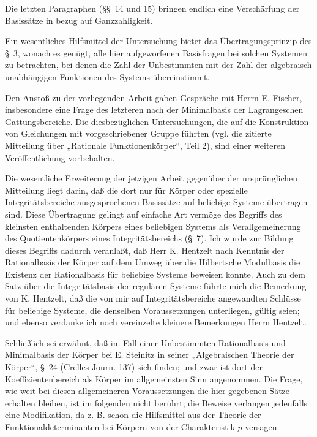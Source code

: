 Die letzten Paragraphen (\S\S\ 14 und 15) bringen endlich eine Verschärfung der Basissätze in bezug auf Ganzzahligkeit.

Ein wesentliches Hilfsmittel der Untersuchung bietet das Übertragungsprinzip des \S\ 3, wonach es genügt, alle hier aufgeworfenen Basisfragen bei solchen Systemen zu betrachten, bei denen die Zahl der Unbestimmten mit der Zahl der algebraisch unabhängigen Funktionen des Systems übereinstimmt.

Den Anstoß zu der vorliegenden Arbeit gaben Gespräche mit Herrn E. Fischer, insbesondere eine Frage des letzteren nach der Minimalbasis der Lagrangeschen Gattungsbereiche. Die diesbezüglichen Untersuchungen, die auf die Konstruktion von Gleichungen mit vorgeschriebener Gruppe führten (vgl. die zitierte Mitteilung über „Rationale Funktionenkörper“, Teil 2), sind einer weiteren Veröffentlichung vorbehalten.

Die wesentliche Erweiterung der jetzigen Arbeit gegenüber der ursprünglichen Mitteilung liegt darin, daß die dort nur für Körper oder spezielle Integritätsbereiche ausgesprochenen Basissätze auf beliebige Systeme übertragen sind. Diese Übertragung gelingt auf einfache Art vermöge des Begriffs des kleinsten enthaltenden Körpers eines beliebigen Systems als Verallgemeinerung des Quotientenkörpers eines Integritätsbereichs (\S\ 7). Ich wurde zur Bildung dieses Begriffs dadurch veranlaßt, daß Herr K. Hentzelt nach Kenntnis der Rationalbasis der Körper auf dem Umweg über die Hilbertsche Modulbasis die Existenz der Rationalbasis für beliebige Systeme beweisen konnte. Auch zu dem Satz über die Integritätsbasis der regulären Systeme führte mich die Bemerkung von K. Hentzelt, daß die von mir auf Integritätsbereiche angewandten Schlüsse für beliebige Systeme, die denselben Voraussetzungen unterliegen, gültig seien; und ebenso verdanke ich noch vereinzelte kleinere Bemerkungen Herrn Hentzelt.

Schließlich sei erwähnt, daß im Fall einer Unbestimmten Rationalbasis und Minimalbasis der Körper bei E. Steinitz in seiner „Algebraischen Theorie der Körper“, \S\ 24 (Crelles Journ. 137) sich finden; und zwar ist dort der Koeffizientenbereich als Körper im allgemeinsten Sinn angenommen. Die Frage, wie weit bei diesen allgemeineren Voraussetzungen die hier gegebenen Sätze erhalten bleiben, ist im folgenden nicht berührt; die Beweise verlangen jedenfalls eine Modifikation, da z. B. schon die Hilfsmittel aus der Theorie der Funktionaldeterminanten bei Körpern von der Charakteristik $p$ versagen.

